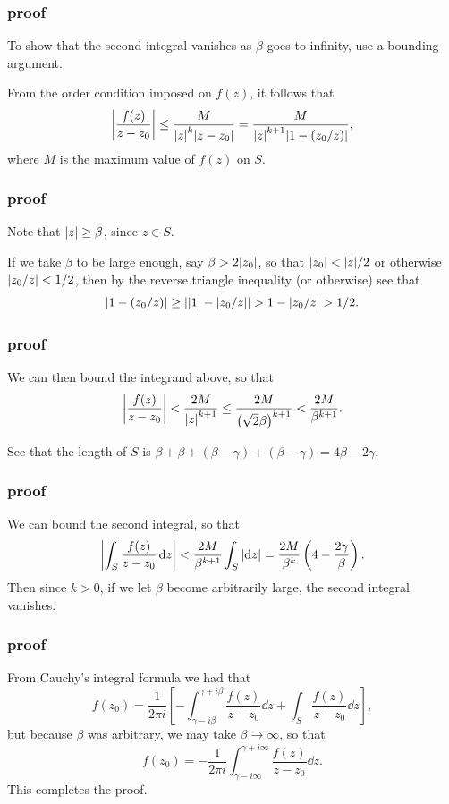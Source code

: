 \documentclass[mathserif]{beamer}
\newcommand{\br}[1]{\left(#1\right)}
\newcommand{\sbr}[1]{\left[#1\right]}
\begin{document}
\begin{frame}
  \frametitle{proof}

  To show that the second integral vanishes as $\beta$ goes to infinity, use a bounding argument. %
  
  From the order condition imposed on $f(z)$, it follows that \[\abs{\frac{f(z)}{z-z_0}} \leq \frac{M}{\abs{z}^k\abs{z-z_0}} = \frac{M}{\abs{z}^{k+1}\abs{1-(z_0/z)}},\] where $M$ is the maximum value of $f(z)$ on $S$.

\end{frame}

\begin{frame}
  \frametitle{proof}

  Note that $\abs{z}\geq \beta$, since $z\in S$.
  
  If we take $\beta$ to be large enough, say $\beta > 2\abs{z_0}$, so that $\abs{z_0} < \abs{z}/2$ or otherwise $\abs{z_0/z} < 1/2$, then by the reverse triangle inequality (or otherwise) see that \[\abs{1-(z_0/z)}\geq \abs{\abs{1}-\abs{z_0/z}} > 1-\abs{z_0/z} > 1/2.\]


  

\end{frame}

\begin{frame}
  \frametitle{proof}

  We can then bound the integrand above, so that \[\abs{\frac{f(z)}{z-z_0}} < \frac{2M}{\abs{z}^{k+1}} \leq \frac{2M}{\br{\sqrt{2}\beta}^{k+1}} < \frac{2M}{\beta^{k+1}}.\]

  See that the length of $S$ is $\beta + \beta + (\beta-\gamma) + (\beta-\gamma) = 4\beta-2\gamma$.

\end{frame}

\begin{frame}
  \frametitle{proof}

  We can bound the second integral, so that \[\abs{\int_S\frac{f(z)}{z-z_0}\dd{z}} < \frac{2M}{\beta^{k+1}}\int_S \abs{\dd{z}} = \frac{2M}{\beta^k}\br{4-\frac{2\gamma}{\beta}}.\] Then since $k>0$, if we let $\beta$ become arbitrarily large, the second integral vanishes. 

\end{frame}

\begin{frame}
  \frametitle{proof}

  From Cauchy's integral formula we had that \[f(z_0) = \frac{1}{2\pi i}\sbr{-\int_{\gamma-i\beta}^{\gamma + i\beta}\frac{f(z)}{z-z_0}\dd{z} + \int_S\frac{f(z)}{z-z_0}\dd{z}},\] but because $\beta$ was arbitrary, we may take $\beta\to\infty$, so that \[f(z_0) = -\frac{1}{2\pi i}\int_{\gamma-i\infty}^{\gamma + i\infty}\frac{f(z)}{z-z_0}\dd{z}.\] This completes the proof.

\end{frame}
\end{document}
